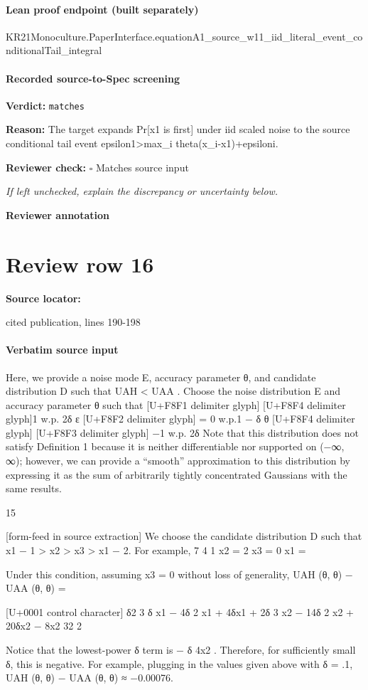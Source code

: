 \documentclass[10pt]{article}
\newcommand{\reviewerbox}{%
  \par\noindent\fbox{\parbox{0.96\linewidth}{\rule{0pt}{0.38in}}}\par
}
\newcommand{\reviewmatch}[1]{%
  \par\noindent\textbf{Reviewer check:} $\square$\; #1\par
  \noindent\emph{If left unchecked, explain the discrepancy or uncertainty below.}\par
}
\begin{document}
\paragraph{Lean proof endpoint (built separately)}\begin{ReviewVerbatim}
KR21Monoculture.PaperInterface.equationA1_source_w11_iid_literal_event_conditionalTail_integral
\end{ReviewVerbatim}

\paragraph{Recorded source-to-Spec screening}
\textbf{Verdict:} \texttt{matches}
\\
{\raggedright
\textbf{Reason:} The target expands Pr[x1 is first] under iid scaled noise to the source conditional tail event epsilon1>max\_\allowbreak{}i theta(x\_\allowbreak{}i-\allowbreak{}x1)+epsiloni.\allowbreak{}
\par}
\reviewmatch{Matches source input}
\noindent\textbf{Reviewer annotation}\par
\reviewerbox
\clearpage
\hypertarget{source-claim-aa9b8f734e8009d3}{}
\section*{Review row 16}
\textbf{Source locator:} {\footnotesize\raggedright cited publication, lines 190-\allowbreak{}198\par}
\paragraph{Verbatim source input}
\begin{ReviewVerbatim}
Here, we provide a noise mode E, accuracy parameter θ, and candidate distribution D such that UAH < UAA .
Choose the noise distribution E and accuracy parameter θ such that
[U+F8F1 delimiter glyph]
[U+F8F4 delimiter glyph]1
w.p. 2δ
ε [U+F8F2 delimiter glyph]
= 0
w.p.1 − δ
θ [U+F8F4 delimiter glyph]
[U+F8F3 delimiter glyph]
−1 w.p. 2δ
Note that this distribution does not satisfy Definition 1 because it is neither differentiable nor supported on
(−∞, ∞); however, we can provide a “smooth” approximation to this distribution by expressing it as the
sum of arbitrarily tightly concentrated Gaussians with the same results.

15


[form-feed in source extraction]
We choose the candidate distribution D such that x1 − 1 > x2 > x3 > x1 − 2. For example,
7
4
1
x2 =
2
x3 = 0
x1 =

Under this condition, assuming x3 = 0 without loss of generality,
UAH (θ, θ) − UAA (θ, θ) =

[U+0001 control character]
δ2 3
δ x1 − 4δ 2 x1 + 4δx1 + 2δ 3 x2 − 14δ 2 x2 + 20δx2 − 8x2
32
2

Notice that the lowest-power δ term is − δ 4x2 . Therefore, for sufficiently small δ, this is negative. For
example, plugging in the values given above with δ = .1, UAH (θ, θ) − UAA (θ, θ) ≈ −0.00076.
\end{ReviewVerbatim}
\end{document}
